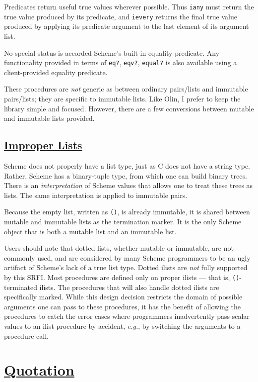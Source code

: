 Predicates return useful true values wherever possible. Thus
\texttt{iany} must return the true value produced by its predicate, and
\texttt{ievery} returns the final true value produced by applying its
predicate argument to the last element of its argument list.

No special status is accorded Scheme's built-in equality predicate. Any
functionality provided in terms of \texttt{eq?}, \texttt{eqv?},
\texttt{equal?} is also available using a client-provided equality
predicate.

These procedures are \emph{not} generic as between ordinary pairs/lists
and immutable pairs/lists; they are specific to immutable lists. Like
Olin, I prefer to keep the library simple and focused. However, there
are a few conversions between mutable and immutable lists provided.

\subsection{\texorpdfstring{\href{}{Improper
Lists}}{Improper Lists}}\label{improper-lists}

Scheme does not properly have a list type, just as C does not have a
string type. Rather, Scheme has a binary-tuple type, from which one can
build binary trees. There is an \emph{interpretation} of Scheme values
that allows one to treat these trees as lists. The same interpretation
is applied to immutable pairs.

Because the empty list, written as \texttt{()}, is already immutable, it
is shared between mutable and immutable lists as the termination marker.
It is the only Scheme object that is both a mutable list and an
immutable list.

Users should note that dotted lists, whether mutable or immutable, are
not commonly used, and are considered by many Scheme programmers to be
an ugly artifact of Scheme's lack of a true list type. Dotted ilists are
\emph{not} fully supported by this SRFI. Most procedures are defined
only on proper ilists --- that is, \texttt{()}-terminated ilists. The
procedures that will also handle dotted ilists are specifically marked.
While this design decision restricts the domain of possible arguments
one can pass to these procedures, it has the benefit of allowing the
procedures to catch the error cases where programmers inadvertently pass
scalar values to an ilist procedure by accident, \emph{e.g.}, by
switching the arguments to a procedure call.

\section{\texorpdfstring{\href{}{Quotation}}{Quotation}}\label{quotation}

